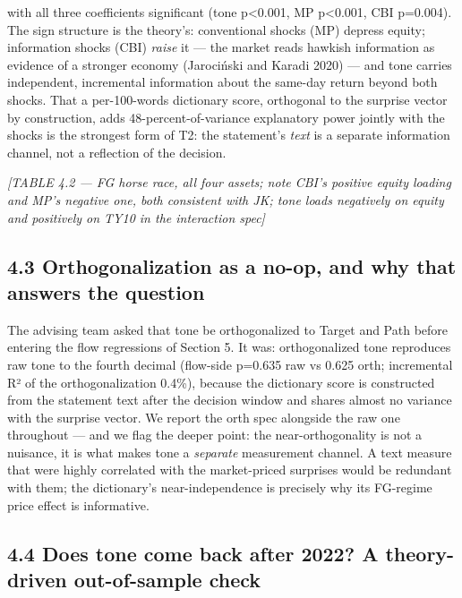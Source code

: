 

with all three coefficients significant (tone p\textless0.001, MP p\textless0.001, CBI p=0.004). The sign structure is the theory's: conventional shocks (MP) depress equity; information shocks (CBI) \emph{raise} it --- the market reads hawkish information as evidence of a stronger economy (Jarociński and Karadi 2020) --- and tone carries independent, incremental information about the same-day return beyond both shocks. That a per-100-words dictionary score, orthogonal to the surprise vector by construction, adds 48-percent-of-variance explanatory power jointly with the shocks is the strongest form of T2: the statement's \emph{text} is a separate information channel, not a reflection of the decision.

\emph{{[}TABLE 4.2 --- FG horse race, all four assets; note CBI's positive equity loading and MP's negative one, both consistent with JK; tone loads negatively on equity and positively on TY10 in the interaction spec{]}}

\subsection{4.3 Orthogonalization as a no-op, and why that answers the question}\label{orthogonalization-as-a-no-op-and-why-that-answers-the-question}

The advising team asked that tone be orthogonalized to Target and Path before entering the flow regressions of Section 5. It was: orthogonalized tone reproduces raw tone to the fourth decimal (flow-side p=0.635 raw vs 0.625 orth; incremental R² of the orthogonalization 0.4\%), because the dictionary score is constructed from the statement text after the decision window and shares almost no variance with the surprise vector. We report the orth spec alongside the raw one throughout --- and we flag the deeper point: the near-orthogonality is not a nuisance, it is what makes tone a \emph{separate} measurement channel. A text measure that were highly correlated with the market-priced surprises would be redundant with them; the dictionary's near-independence is precisely why its FG-regime price effect is informative.

\subsection{4.4 Does tone come back after 2022? A theory-driven out-of-sample check}\label{does-tone-come-back-after-2022-a-theory-driven-out-of-sample-check}

